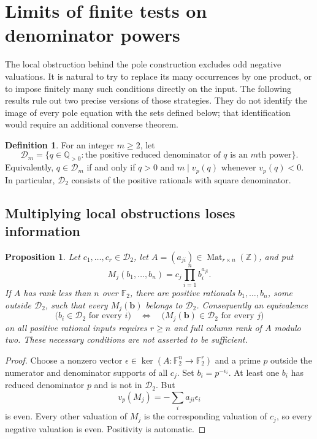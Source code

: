 \documentclass[11pt]{article}
\newtheorem{proposition}[theorem]{Proposition}
\theoremstyle{definition}
\newtheorem{definition}[theorem]{Definition}
\begin{document}
\section{Limits of finite tests on denominator powers}
\label{sec:denominator-obstructions}

The local obstruction behind the pole construction excludes odd negative
valuations.  It is natural to try to replace its many occurrences by
one product, or to impose finitely many such conditions directly on the
input.  The following results rule out two precise versions of those
strategies.  They do not identify the image of every pole equation with
the sets defined below; that identification would require an additional
converse theorem.

\begin{definition}
For an integer $m\ge2$, let
\[
 \mathcal D_m=\{q\in\mathbb Q_{>0}:
       \text{the positive reduced denominator of $q$ is an $m$th power}\}.
\]
Equivalently, $q\in\mathcal D_m$ if and only if $q>0$ and
$m\mid v_p(q)$ whenever $v_p(q)<0$.  In particular,
$\mathcal D_2$ consists of the positive rationals with square
denominator.
\end{definition}

\subsection{Multiplying local obstructions loses information}

\begin{proposition}\label{prop:denominator-monomial-rank}
Let $c_1,\ldots,c_r\in\mathcal D_2$, let
$A=(a_{ji})\in\operatorname{Mat}_{r\times n}(\mathbb Z)$, and put
\[
 M_j(b_1,\ldots,b_n)=c_j\prod_{i=1}^n b_i^{a_{ji}}.
\]
If $A$ has rank less than $n$ over $\mathbb F_2$, there are positive
rationals $b_1,\ldots,b_n$, some outside $\mathcal D_2$, such that
every $M_j(\mathbf b)$ belongs to $\mathcal D_2$.
Consequently an equivalence
\[
 \bigl(b_i\in\mathcal D_2\text{ for every }i\bigr)
 \quad\Longleftrightarrow\quad
 \bigl(M_j(\mathbf b)\in\mathcal D_2\text{ for every }j\bigr)
\]
on all positive rational inputs requires $r\ge n$ and full column
rank of $A$ modulo two.  These necessary conditions are not asserted
to be sufficient.
\end{proposition}
\begin{proof}
Choose a nonzero vector $\epsilon\in\ker(A:\mathbb F_2^n\to
\mathbb F_2^r)$ and a prime $p$ outside the numerator and denominator
supports of all $c_j$.  Set $b_i=p^{-\epsilon_i}$.  At least one
$b_i$ has reduced denominator $p$ and is not in $\mathcal D_2$.
But
\[
 v_p(M_j)=-\sum_i a_{ji}\epsilon_i
\]
is even.  Every other valuation of $M_j$ is the corresponding
valuation of $c_j$, so every negative valuation is even.  Positivity
is automatic.
\end{proof}
\end{document}
